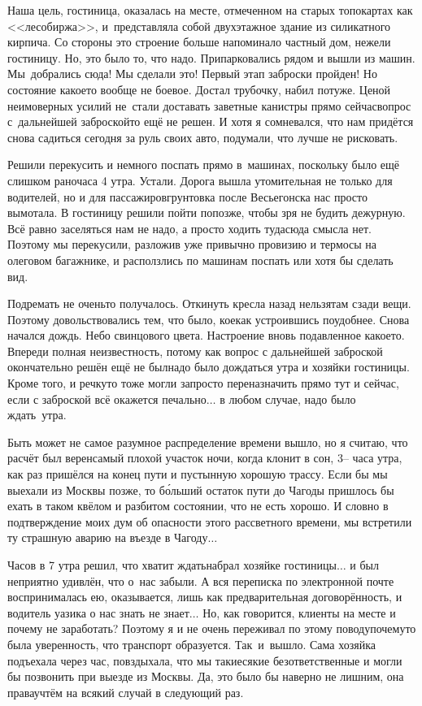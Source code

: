 Наша цель, гостиница, оказалась на месте, отмеченном на старых топокартах как <<лесобиржа>>, и~представляла собой двухэтажное здание из силикатного кирпича. Со стороны это строение больше напоминало частный дом, нежели гостиницу. Но, это было то, что надо. Припарковались рядом и вышли из машин. Мы~добрались сюда! Мы сделали это! Первый этап заброски пройден! Но состояние какое\sdash то вообще не боевое. Достал трубочку, набил потуже. Ценой неимоверных усилий не~стали доставать заветные канистры прямо сейчас\mdash вопрос с~дальнейшей заброской\sdash то ещё не решен. И хотя я сомневался, что нам придётся снова садиться сегодня за руль своих авто, подумали, что лучше не рисковать. 

Решили перекусить и немного поспать прямо в~машинах, поскольку было ещё слишком рано\mdash часа 4 утра. Устали. Дорога вышла утомительная не только для водителей, но и для пассажиров\mdash грунтовка после Весьегонска нас просто вымотала. В гостиницу решили пойти попозже, чтобы зря не будить дежурную. Всё равно заселяться нам не надо, а просто ходить туда\sdash сюда смысла нет. Поэтому мы перекусили, разложив уже привычно провизию и термосы на олеговом багажнике, и расползлись по машинам поспать или хотя бы сделать вид. 

Подремать не очень\sdash то получалось. Откинуть кресла назад нельзя\mdash там сзади вещи. Поэтому довольствовались тем, что было, кое\sdash как устроившись поудобнее. Снова начался дождь. Небо свинцового цвета. Настроение вновь подавленное какое\sdash то. Впереди полная неизвестность, потому как вопрос с дальнейшей заброской окончательно решён ещё не был\mdash надо было дождаться утра и хозяйки гостиницы. Кроме того, и речку\sdash то тоже могли запросто переназначить прямо тут и сейчас, если с заброской всё окажется печально$\ldots$ в любом случае, надо было ждать~утра. 

Быть может не самое разумное распределение времени вышло, но я считаю, что расчёт был верен\mdash самый плохой участок ночи, когда клонит в сон, 3\thinspace\nobreakdash-- часа утра, как раз пришёлся на конец пути и пустынную хорошую трассу. Если бы мы выехали из Москвы позже, то б\'{о}льший остаток пути до Чагоды пришлось бы ехать в таком квёлом и разбитом состоянии, что не есть хорошо. И словно в подтверждение моих дум об опасности этого рассветного времени, мы встретили ту страшную аварию на въезде в Чагоду$\ldots$

Часов в 7 утра решил, что хватит ждать\mdash набрал хозяйке гостиницы$\ldots$ и был неприятно удивлён, что о~нас забыли. А вся переписка по электронной почте воспринималась ею, оказывается, лишь как предварительная договорённость, и водитель уазика о нас знать не знает$\ldots$ Но, как говорится, клиенты на месте и почему не заработать? Поэтому я и не очень переживал по этому поводу\mdash почему\sdash то была уверенность, что транспорт образуется. Так~и~вышло. Сама хозяйка подъехала через час, повздыхала, что мы такие\sdash сякие безответственные и могли бы позвонить при выезде из Москвы. Да, это было бы наверно не лишним, она права\mdash учтём на всякий случай в следующий раз. 

